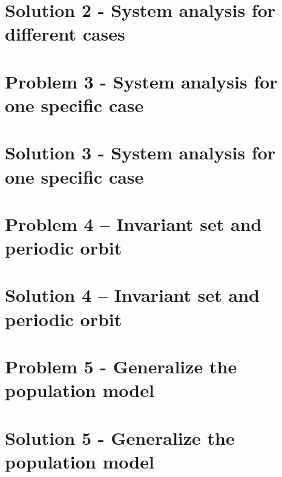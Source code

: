 \documentclass[a4paper,twocolumn]{article} %
\begin{document}
\section*{Solution 2 - System analysis for different cases}
\label{sec:solu2}



\section*{Problem 3 - System analysis for one specific case}
\label{sec:prob3} 



\section*{Solution 3 - System analysis for one specific case}
\label{sec:solu3}



\section*{Problem 4 -- Invariant set and periodic orbit}
\label{sec:pro4}



\section*{Solution 4 -- Invariant set and periodic orbit}
\label{sec:sol4}



\section*{Problem 5 - Generalize the population model}
\label{sec:prob5}

 
 

\section*{Solution 5 - Generalize the population model}
\label{sec:solu5}



\clearpage





\end{document}
